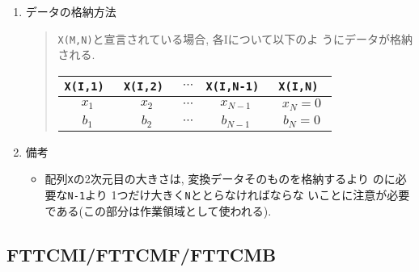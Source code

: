 \documentclass[a4j]{jarticle}
\begin{document}
\begin{enumerate}
  \item データの格納方法
  \begin{quote}
  
  {\tt X(M,N)}と宣言されている場合, 各Iについて以下のよ
   うにデータが格納される.

    \begin{tabular}{|c|c|c|c|c|}\hline
     \tt X(I,1) & \tt X(I,2) & 
     $\cdots$ & \tt X(I,N-1) & \tt X(I,N) \\\hline\hline
      $x_1$ & $x_2$ &
     $\cdots$ & $x_{N-1}$ & $x_N=0$ \\\hline
      $b_1$ & $b_2$ & 
     $\cdots$ & $b_{N-1}$ & $b_N=0$ \\\hline
    \end{tabular}
  \end{quote}
  
  \item 備考
 
   \begin{itemize}
    \item 配列{\tt X}の2次元目の大きさは, 変換データそのものを格納するより
          のに必要な{\tt N-1}より 1つだけ大きく{\tt N}ととらなければならな
	  いことに注意が必要である(この部分は作業領域として使われる).
    \end{itemize}

\end{enumerate}

\subsection{FTTCMI/FTTCMF/FTTCMB}
\end{document}
